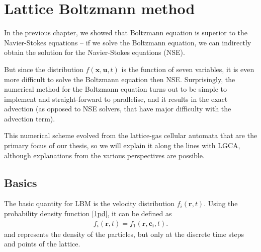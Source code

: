 \chapter{Lattice Boltzmann method}

In the previous chapter, we showed that Boltzmann equation is superior to the Navier-Stokes equations -- if we solve the Boltzmann equation, we can indirectly obtain the solution for the Navier-Stokes equations (NSE).

But since the distribution $f(\bm{x},\bm{u},t)$ is the function of seven variables, it is even more difficult to solve the Boltzmann equation then NSE. 
Surprisingly, the numerical method for the Boltzmann equation turns out to be simple to implement and straight-forward to parallelise, and it results in the exact advection (as opposed to NSE solvers, that have major difficulty with the advection term). 

This numerical scheme evolved from the lattice-gas cellular automata that are the primary focus of our thesis, so we will explain it along the lines with LGCA, although explanations from the various perspectives are possible.


%
\section{Basics}
The basic quantity for LBM is the velocity distribution $f_i(\bm{r},t)$.
Using the probability density function \ref{1pd}, it can be defined as
\begin{align*}
f_i(\bm{r},t) = f_1(\bm{r}, \bm{c_i}, t).
\end{align*}
and represents the density of the particles, but only at the discrete time steps and points of the lattice.

